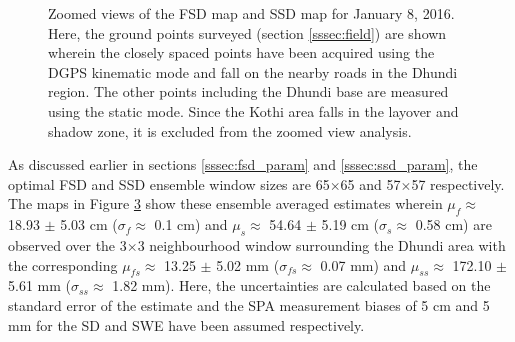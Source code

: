 \documentclass[review]{elsarticle}
\numberwithin{equation}{section}
\numberwithin{figure}{section}
\numberwithin{table}{section}
\begin{document}
\afterpage{\FloatBarrier}
\begin{figure}[htb]
    \centering
    \begin{subfigure}[t]{\textwidth}
        \caption{}
        \label{subfig:fsd_map}
    \end{subfigure}
    \begin{subfigure}[t]{\textwidth}
        \caption{}
        \label{subfig:ssd_map}
    \end{subfigure}
    \caption{Zoomed views of the  FSD map and  SSD map for January 8, 2016. Here, the ground points surveyed (section \ref{sssec:field}) are shown wherein the closely spaced points have been acquired using the DGPS kinematic mode and fall on the nearby roads in the Dhundi region. The other points including the Dhundi base are measured using the static mode. Since the Kothi area falls in the layover and shadow zone, it is excluded from the zoomed view analysis.}
    \label{fig:sd_maps}
\end{figure}

As discussed earlier in sections \ref{sssec:fsd_param} and \ref{sssec:ssd_param}, the optimal FSD and SSD ensemble window sizes are 65$\times$65 and 57$\times$57 respectively. The maps in Figure \ref{fig:sd_maps} show these ensemble averaged estimates wherein $\mu_f \approx$ 18.93 $\pm$ 5.03 cm ($\sigma_f \approx$ 0.1 cm) and $\mu_s \approx$ 54.64 $\pm$ 5.19 cm ($\sigma_s \approx$ 0.58 cm) are observed over the 3$\times$3 neighbourhood window surrounding the Dhundi area with the corresponding $\mu_{fs} \approx$ 13.25 $\pm$ 5.02 mm ($\sigma_{fs} \approx$ 0.07 mm) and $\mu_{ss} \approx$ 172.10 $\pm$ 5.61 mm ($\sigma_{ss} \approx$ 1.82 mm). Here, the uncertainties are calculated based on the standard error of the estimate and the SPA measurement biases of 5 cm and 5 mm for the SD and SWE have been assumed respectively.
\end{document}

